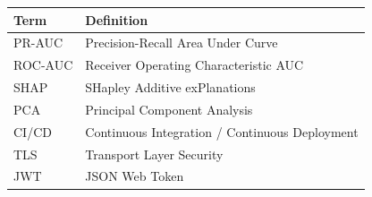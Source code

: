 \documentclass[12pt,a4paper]{article}
\begin{document}
\begin{table}[H]
\centering
\small
\begin{tabular}{|l|l|}
\hline
\textbf{Term} & \textbf{Definition} \\
\hline
PR-AUC & Precision-Recall Area Under Curve \\
ROC-AUC & Receiver Operating Characteristic AUC \\
SHAP & SHapley Additive exPlanations \\
PCA & Principal Component Analysis \\
CI/CD & Continuous Integration / Continuous Deployment \\
TLS & Transport Layer Security \\
JWT & JSON Web Token \\
\hline
\end{tabular}
\end{table}

\end{document}
